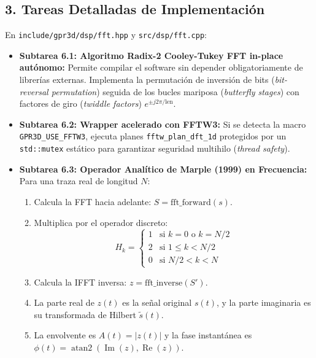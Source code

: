 \documentclass[11pt,a4paper]{article}
\begin{document}
\subsection{3. Tareas Detalladas de Implementación}
En \texttt{include/gpr3d/dsp/fft.hpp} y \texttt{src/dsp/fft.cpp}:
\begin{itemize}
    \item \textbf{Subtarea 6.1: Algoritmo Radix-2 Cooley-Tukey FFT in-place autónomo:}
    Permite compilar el software sin depender obligatoriamente de librerías externas.
    Implementa la permutación de inversión de bits (\textit{bit-reversal permutation}) seguida de los bucles mariposa (\textit{butterfly stages}) con factores de giro (\textit{twiddle factors}) $e^{\pm j 2\pi / \text{len}}$.
    
    \item \textbf{Subtarea 6.2: Wrapper acelerado con FFTW3:}
    Si se detecta la macro \texttt{GPR3D\_USE\_FFTW3}, ejecuta planes \texttt{fftw\_plan\_dft\_1d} protegidos por un \texttt{std::mutex} estático para garantizar seguridad multihilo (\textit{thread safety}).

    \item \textbf{Subtarea 6.3: Operador Analítico de Marple (1999) en Frecuencia:}
    Para una traza real de longitud $N$:
    \begin{enumerate}
        \item Calcula la FFT hacia adelante: $S = \text{fft\_forward}(s)$.
        \item Multiplica por el operador discreto:
        \begin{equation}
            H_k = \begin{cases} 1 & \text{si } k = 0 \text{ o } k = N/2 \\ 2 & \text{si } 1 \le k < N/2 \\ 0 & \text{si } N/2 < k < N \end{cases}
        \end{equation}
        \item Calcula la IFFT inversa: $z = \text{fft\_inverse}(S')$.
        \item La parte real de $z(t)$ es la señal original $s(t)$, y la parte imaginaria es su transformada de Hilbert $\tilde{s}(t)$.
        \item La envolvente es $A(t) = |z(t)|$ y la fase instantánea es $\phi(t) = \operatorname{atan2}(\operatorname{Im}(z), \operatorname{Re}(z))$.
    \end{enumerate}
\end{itemize}
\end{document}
